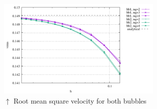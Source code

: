 \begin{center}
\includegraphics[width=8cm]{python_codes/fieldstone_75/results/mms3D/vrms.pdf}\\
{\captionfont $\uparrow$ Root mean square velocity for both bubbles}
\end{center}




